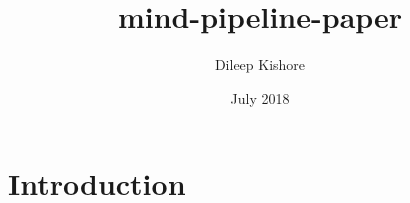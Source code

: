 \documentclass{article}
\title{mind-pipeline-paper}
\author{Dileep Kishore}
\date{July 2018}
\begin{document}
\maketitle

\section{Introduction}
\end{document}
